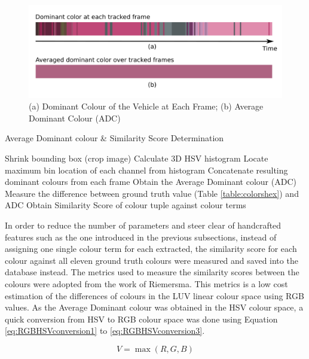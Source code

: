 \begin{figure}[hbt!]\centering
\includegraphics[width=.9\textwidth]{image/general/ADC.png}
\caption{(a) Dominant Colour of the Vehicle at Each Frame; (b) Average Dominant Colour (ADC)}
\label{fig:ADC}
\end{figure}

\begin{algorithm}[H]
  \caption{Average Dominant colour \& Similarity Score Determination}
  \label{algo:ADC}
  \begin{algorithmic}[1]
        \STATE Shrink bounding box (crop image)
        \STATE Calculate 3D HSV histogram
        \STATE Locate maximum bin location of each channel from histogram
        \STATE Concatenate resulting dominant colours from each frame
        \STATE Obtain the Average Dominant colour (ADC)
        \STATE Measure the difference between ground truth value (Table \ref{table:colorshex}) and ADC
        \STATE Obtain Similarity Score of colour tuple against colour terms
    \ENDFOR
  \end{algorithmic}
\end{algorithm}

In order to reduce the number of parameters and steer clear of handcrafted features such as the one introduced in the previous subsections, instead of assigning one single colour term for each extracted, the similarity score for each colour against all eleven ground truth colours were measured and saved into the database instead. The metrics used to measure the similarity scores between the colours were adopted from the work of Riemersma\cite{riemersma}. This metrics is a low cost estimation of the differences of colours in the LUV linear colour space using RGB values. As the Average Dominant colour was obtained in the HSV colour space, a quick conversion from HSV to RGB colour space was done using Equation \ref{eq:RGBHSVconversion1} to \ref{eq:RGBHSVconversion3}.


\begin{equation}
\label{eq:RGBHSVconversion1}
V = \max(R,G,B)
\end{equation}

